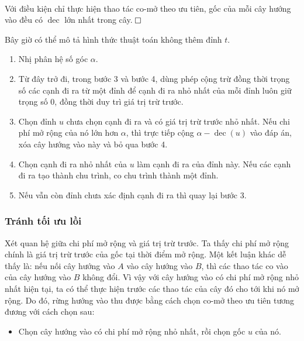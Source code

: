 \documentclass[11pt]{article}
\newcommand{\proofbox}{\ensuremath{\vcenter{\hrule height 0.45pt
  \hbox{\vrule width 0.45pt height 6pt\kern 6pt\vrule width 0.45pt}
  \hrule height 0.45pt}}}
\begin{document}
\paragraph{}
Với điều kiện chỉ thực hiện thao tác co-mở theo ưu tiên, gốc của mỗi cây hướng
vào đều có \(\operatorname{dec}\) lớn nhất trong cây. \proofbox

Bây giờ có thể mô tả hình thức thuật toán không thêm đỉnh \(t\).

\begin{enumerate}
  \item Nhị phân hệ số góc \(\alpha\).
  \item Từ đây trở đi, trong bước 3 và bước 4, dùng phép cộng trừ đồng thời
  trọng số các cạnh đi ra từ một đỉnh để cạnh đi ra nhỏ nhất của mỗi đỉnh luôn
  giữ trọng số \(0\), đồng thời duy trì giá trị trừ trước.
  \item Chọn đỉnh \(u\) chưa chọn cạnh đi ra và có giá trị trừ trước nhỏ nhất.
  Nếu chi phí mở rộng của nó lớn hơn \(\alpha\), thì trực tiếp cộng
  \(\alpha-\operatorname{dec}(u)\) vào đáp án, xóa cây hướng vào này và bỏ qua
  bước 4.
  \item Chọn cạnh đi ra nhỏ nhất của \(u\) làm cạnh đi ra của đỉnh này. Nếu các
  cạnh đi ra tạo thành chu trình, co chu trình thành một đỉnh.
  \item Nếu vẫn còn đỉnh chưa xác định cạnh đi ra thì quay lại bước 3.
\end{enumerate}

\subsubsection{Tránh tối ưu lồi}

Xét quan hệ giữa chi phí mở rộng và giá trị trừ trước. Ta thấy chi phí mở rộng
chính là giá trị trừ trước của gốc tại thời điểm mở rộng. Một kết luận khác dễ
thấy là: nếu nối cây hướng vào \(A\) vào cây hướng vào \(B\), thì các thao tác
co vào của cây hướng vào \(B\) không đổi. Vì vậy với cây hướng vào có chi phí
mở rộng nhỏ nhất hiện tại, ta có thể thực hiện trước các thao tác của cây đó
cho tới khi nó mở rộng. Do đó, rừng hướng vào thu được bằng cách chọn co-mở theo
ưu tiên tương đương với cách chọn sau:

\begin{itemize}
  \item Chọn cây hướng vào có chi phí mở rộng nhỏ nhất, rồi chọn gốc \(u\) của
  nó.
\end{itemize}
\end{document}
